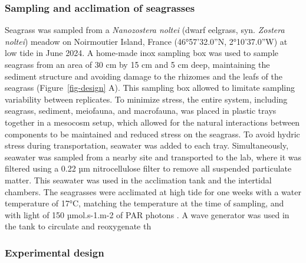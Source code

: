 \documentclass[
  number]{elsarticle}
\begin{document}
\subsubsection{Sampling and acclimation of
seagrasses}\label{sampling-and-acclimation-of-seagrasses}

Seagrass was sampled from a \emph{Nanozostera noltei} (dwarf eelgrass,
syn. \emph{Zostera noltei}) meadow on Noirmoutier Island, France
(46°57'32.0''N, 2°10'37.0''W) at low tide in June 2024. A home-made inox
sampling box was used to sample seagrass from an area of 30 cm by 15 cm
and 5 cm deep, maintaining the sediment structure and avoiding damage to
the rhizomes and the leafs of the seagrass (Figure~\ref{fig-design} A).
This sampling box allowed to limitate sampling variability between
replicates. To minimize stress, the entire system, including seagrass,
sediment, meiofauna, and macrofauna, was placed in plastic trays
together in a mesocosm setup, which allowed for the natural interactions
between components to be maintained and reduced stress on the seagrass.
To avoid hydric stress during transportation, seawater was added to each
tray. Simultaneously, seawater was sampled from a nearby site and
transported to the lab, where it was filtered using a 0.22 µm
nitrocellulose filter to remove all suspended particulate matter. This
seawater was used in the acclimation tank and the intertidal chambers.
The seagrasses were acclimated at high tide for one weeks with a water
temperature of 17°C, matching the temperature at the time of sampling,
and with light of 150 µmol.s-1.m-2 of PAR photons
\citep{akbar2020mangrove}. A wave generator was used in the tank to
circulate and reoxygenate th

\subsubsection{Experimental design}\label{experimental-design}
\end{document}
